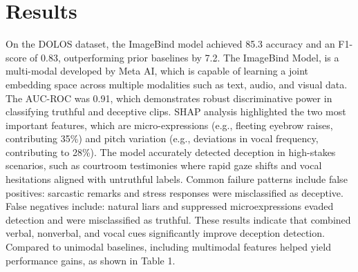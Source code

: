 \documentclass{article} %
\begin{document}
\section{Results}
On the DOLOS dataset, the ImageBind \citep{girdhar2023imagebindembeddingspacebind} model achieved 85.3 accuracy and an F1-score of 0.83, outperforming prior baselines by 7.2. The ImageBind Model, is a multi-modal developed by Meta AI, which is capable of learning a joint embedding space across multiple modalities such as text, audio, and visual data. The AUC-ROC was 0.91, which demonstrates robust discriminative power in classifying truthful and deceptive clips. SHAP analysis \citep{lundberg2017unifiedapproachinterpretingmodel} highlighted the two most important features, which are micro-expressions (e.g., fleeting eyebrow raises, contributing 35\%) and pitch variation (e.g., deviations in vocal frequency, contributing to 28\%). The model accurately detected deception in high-stakes scenarios, such as courtroom testimonies where rapid gaze shifts and vocal hesitations aligned with untruthful labels. Common failure patterns include false positives: sarcastic remarks and stress responses were misclassified as deceptive. False negatives include: natural liars and suppressed microexpressions evaded detection and were misclassified as truthful. These results indicate that combined verbal, nonverbal, and vocal cues significantly improve deception detection. Compared to unimodal baselines, including multimodal features helped yield performance gains, as shown in Table 1.
\end{document}
